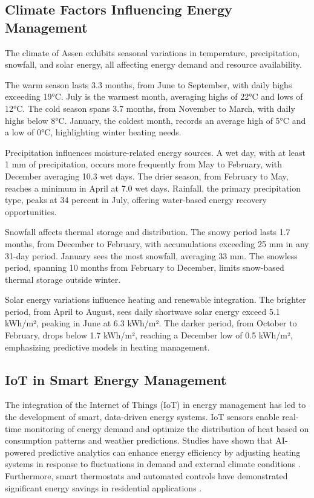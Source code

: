 \documentclass[conference]{IEEEtran}
\begin{document}
\subsection{Climate Factors Influencing Energy Management}
The climate of Assen exhibits seasonal variations in temperature, precipitation, snowfall, and solar energy, all affecting energy demand and resource availability.

The warm season lasts 3.3 months, from June to September, with daily highs exceeding 19°C. July is the warmest month, averaging highs of 22°C and lows of 12°C. The cold season spans 3.7 months, from November to March, with daily highs below 8°C. January, the coldest month, records an average high of 5°C and a low of 0°C, highlighting winter heating needs. \cite{weatherspark_assen}

Precipitation influences moisture-related energy sources. A wet day, with at least 1 mm of precipitation, occurs more frequently from May to February, with December averaging 10.3 wet days. The drier season, from February to May, reaches a minimum in April at 7.0 wet days. Rainfall, the primary precipitation type, peaks at 34 percent in July, offering water-based energy recovery opportunities. \cite{weatherspark_assen}

Snowfall affects thermal storage and distribution. The snowy period lasts 1.7 months, from December to February, with accumulations exceeding 25 mm in any 31-day period. January sees the most snowfall, averaging 33 mm. The snowless period, spanning 10 months from February to December, limits snow-based thermal storage outside winter. \cite{weatherspark_assen}

Solar energy variations influence heating and renewable integration. The brighter period, from April to August, sees daily shortwave solar energy exceed 5.1 kWh/m², peaking in June at 6.3 kWh/m². The darker period, from October to February, drops below 1.7 kWh/m², reaching a December low of 0.5 kWh/m², emphasizing predictive models in heating management. \cite{weatherspark_assen}


\subsection{IoT in Smart Energy Management}
The integration of the Internet of Things (IoT) in energy management has led to the development of smart, data-driven energy systems. IoT sensors enable real-time monitoring of energy demand and optimize the distribution of heat based on consumption patterns and weather predictions\cite{smarthome_iot_big_data}. Studies have shown that AI-powered predictive analytics can enhance energy efficiency by adjusting heating systems in response to fluctuations in demand and external climate conditions \cite{ai_energy}. Furthermore, smart thermostats and automated controls have demonstrated significant energy savings in residential applications \cite{smart_heating}.
\end{document}
